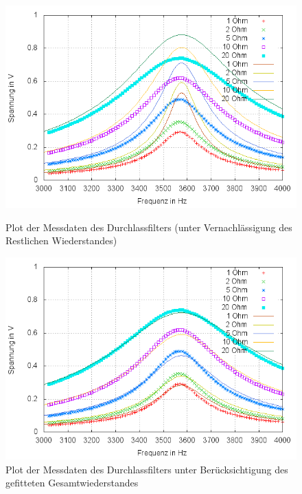 \begin{figure}
        \includegraphics[width=.9\textwidth]{images/plot/durchlassfilter+theorie+R_ges.png}
\caption{Plot der Messdaten des Durchlassfilters (unter Vernachlässigung des Restlichen Wiederstandes)}
\label{plot:durchlass+R_ges}

	\includegraphics[width=.9\textwidth]{images/plot/durchlassfilter+theorie+R_ges-fit.png}
\caption{Plot der Messdaten des Durchlassfilters unter Berücksichtigung des gefitteten Gesamtwiederstandes}
\label{plot:durchlass+R_ges-fit}
\end{figure}
